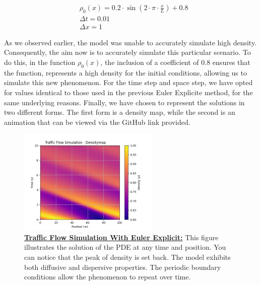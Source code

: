 \documentclass{article}
\begin{document}
	\[
	\boxed{
		\begin{aligned}
			&\rho_0(x)=0.2 \cdot \sin\left(2 \cdot \pi \cdot \frac{x}{L}\right) + 0.8 \\
			&\Delta t = 0.01 \\
			&\Delta x = 1
		\end{aligned}
	}
	\]
	
	As we observed earlier, the model was unable to accurately simulate high density. Consequently, the aim now is to accurately simulate this particular scenario. To do this, in the function $\rho_0(x)$, the inclusion of a coefficient of 0.8 ensures that the function, represents a high density for the initial conditions, allowing us to simulate this new phenomenon. For the time step and space step, we have opted for values identical to those used in the previous Euler Explicite method, for the same underlying reasons. Finally, we have chosen to represent the solutions in two different forms. The first form is a density map, while the second is an animation that can be viewed via the GitHub link provided.
	
	\begin{figure}[H]
		\centering
		\includegraphics[width=0.60\textwidth]{traffic_flow_density_map_LF.png}
		\caption[Traffic Flow Simulation With Euler Explicit]{\textbf{\underline{Traffic Flow Simulation With Euler Explicit:}} This figure illustrates the solution of the PDE at any time and position. You can notice that the peak of density is set back. The model exhibits both diffusive and dispersive properties. The periodic boundary conditions allow the phenomenon to repeat over time.}
		\label{fig:traffic_flow_density_map_LF}
	\end{figure}
	
\end{document}
